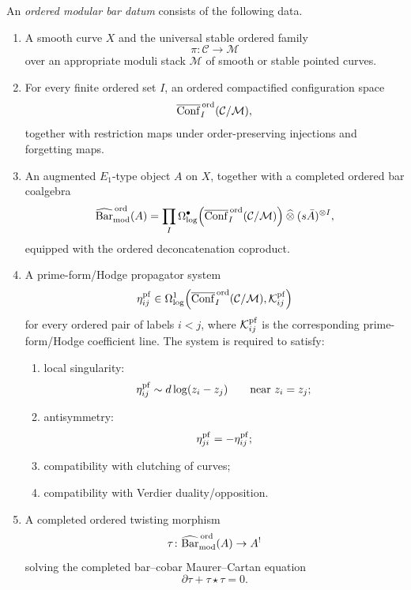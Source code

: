 \begin{definition}
\label{def:ordered-modular-bar-datum}
An \emph{ordered modular bar datum} consists of the following data.

\begin{enumerate}
\item
A smooth curve $X$ and the universal stable ordered family
\[
\pi\colon \mathcal C \longrightarrow \mathcal M
\]
over an appropriate moduli stack $\mathcal M$ of smooth or stable pointed curves.

\item
For every finite ordered set $I$, an ordered compactified configuration space
\[
\overline{\operatorname{Conf}}^{\,\mathrm{ord}}_I(\mathcal C/\mathcal M),
\]
together with restriction maps under order-preserving injections and forgetting maps.

\item
An augmented $E_1$-type object $A$ on $X$, together with a completed ordered bar coalgebra
\[
\widehat{\mathrm{Bar}}^{\,\mathrm{ord}}_{\mathrm{mod}}(A)
=
\prod_{I}
\Omega^\bullet_{\log}\!\left(\overline{\operatorname{Conf}}^{\,\mathrm{ord}}_I(\mathcal C/\mathcal M)\right)
\mathbin{\widehat{\otimes}}
(s\bar A)^{\otimes I},
\]
equipped with the ordered deconcatenation coproduct.

\item
A prime-form/Hodge propagator system
\[
\eta^{\mathrm{pf}}_{ij}\in
\Omega^1_{\log}\!\left(\overline{\operatorname{Conf}}^{\,\mathrm{ord}}_I(\mathcal C/\mathcal M),\mathcal K^{\mathrm{pf}}_{ij}\right)
\]
for every ordered pair of labels $i<j$, where $\mathcal K^{\mathrm{pf}}_{ij}$ is the corresponding
prime-form/Hodge coefficient line. The system is required to satisfy:
\begin{enumerate}
\item local singularity:
\[
\eta^{\mathrm{pf}}_{ij}\sim d\log(z_i-z_j)\qquad\text{near }z_i=z_j;
\]
\item antisymmetry:
\[
\eta^{\mathrm{pf}}_{ji}=-\eta^{\mathrm{pf}}_{ij};
\]
\item compatibility with clutching of curves;
\item compatibility with Verdier duality/opposition.
\end{enumerate}

\item
A completed ordered twisting morphism
\[
\tau\colon \widehat{\mathrm{Bar}}^{\,\mathrm{ord}}_{\mathrm{mod}}(A)\to A^!
\]
solving the completed bar--cobar Maurer--Cartan equation
\[
\partial \tau+\tau\star\tau=0.
\]
\end{enumerate}
\end{definition}

